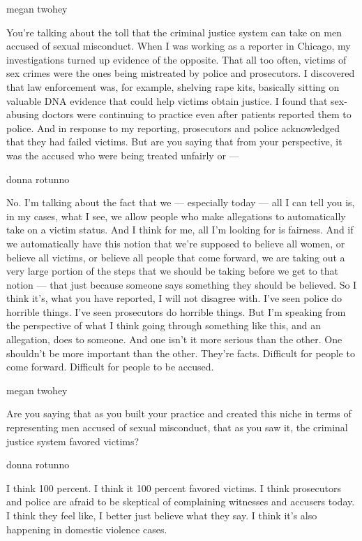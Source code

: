 megan twohey

You're talking about the toll that the criminal justice system can take
on men accused of sexual misconduct. When I was working as a reporter in
Chicago, my investigations turned up evidence of the opposite. That all
too often, victims of sex crimes were the ones being mistreated by
police and prosecutors. I discovered that law enforcement was, for
example, shelving rape kits, basically sitting on valuable DNA evidence
that could help victims obtain justice. I found that sex-abusing doctors
were continuing to practice even after patients reported them to police.
And in response to my reporting, prosecutors and police acknowledged
that they had failed victims. But are you saying that from your
perspective, it was the accused who were being treated unfairly or ---

donna rotunno

No. I'm talking about the fact that we --- especially today --- all I
can tell you is, in my cases, what I see, we allow people who make
allegations to automatically take on a victim status. And I think for
me, all I'm looking for is fairness. And if we automatically have this
notion that we're supposed to believe all women, or believe all victims,
or believe all people that come forward, we are taking out a very large
portion of the steps that we should be taking before we get to that
notion --- that just because someone says something they should be
believed. So I think it's, what you have reported, I will not disagree
with. I've seen police do horrible things. I've seen prosecutors do
horrible things. But I'm speaking from the perspective of what I think
going through something like this, and an allegation, does to someone.
And one isn't it more serious than the other. One shouldn't be more
important than the other. They're facts. Difficult for people to come
forward. Difficult for people to be accused.

megan twohey

Are you saying that as you built your practice and created this niche in
terms of representing men accused of sexual misconduct, that as you saw
it, the criminal justice system favored victims?

donna rotunno

I think 100 percent. I think it 100 percent favored victims. I think
prosecutors and police are afraid to be skeptical of complaining
witnesses and accusers today. I think they feel like, I better just
believe what they say. I think it's also happening in domestic violence
cases.

